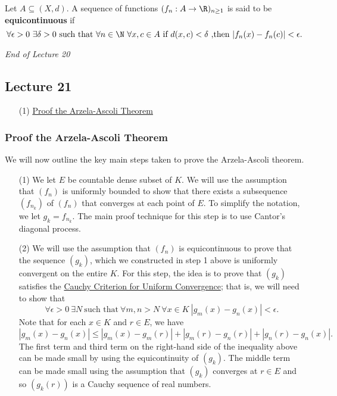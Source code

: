 \begin{definition}\label{Equicontinuous sequence of functions}
    Let \( A \subseteq (X,d) \). A sequence of functions \( ({f}_{n} : A \to \R)_{n \geq 1} \) is said to be \textbf{equicontinuous} if 
    \[  \forall \epsilon > 0 \ \exists \delta > 0 \ \text{such that} \ \forall n \in \N \ \forall x,c \in A \ \text{if} \ d(x,c) < \delta \ \text{,then} \ | {f}_{n}(x) - {f}_{n}(c) |  < \epsilon. \]
\end{definition}

\begin{center}
    \textit{End of Lecture 20} 
\end{center}
\subsection{Lecture 21}

\begin{enumerate}
    \item[(1)] {\hyperref[Proof the Arzela-Ascoli Theorem]{Proof the Arzela-Ascoli Theorem}}
\end{enumerate}


\subsubsection{Proof the Arzela-Ascoli Theorem}\label{Proof the Arzela-Ascoli Theorem}

We will now outline the key main steps taken to prove the Arzela-Ascoli theorem. 

\begin{enumerate}
\item[(1)] We let \( E  \) be countable dense subset of \( K   \). We will use the assumption that \( ({f}_{n}) \) is uniformly bounded to show that there exists a subsequence \( ({f}_{{n}_{k }}) \) of \( ({f}_{n}) \) that converges at each point of \( E  \). To simplify the notation, we let \( {g}_{k } = {f}_{{n}_{k }} \). The main proof technique for this step is to use Cantor's diagonal process. 
\item[(2)] We will use the assumption that \( ({f}_{n}) \) is equicontinuous to prove that the sequence \( ({g}_{k}) \), which we constructed in step 1 above is uniformly convergent on the entire \(  K  \). For this step, the idea is to prove that \( ({g}_{k}) \) satisfies the {\hyperref[Cauchy Criterion for Uniform Convergence]{Cauchy Criterion for Uniform Convergence}}; that is, we will need to show that 
    \[  \forall \epsilon > 0 \ \exists N \ \text{such that} \ \forall m,n > N \ \forall x \in K \ | {g}_{m}(x) - {g}_{n}(x) | < \epsilon. \]
    Note that for each \( x \in K  \) and \( r \in E  \), we have 
    \[  | {g}_{m}(x) - {g}_{n}(x) | \leq | {g}_{m}(x) - {g}_{m}(r) | + | {g}_{m}(r) - {g}_{n}(r)  |  + | {g}_{n}(r) - {g}_{n}(x) |. \]
    The first term and third term on the right-hand side of the inequality above can be made small by using the equicontinuity of \( ({g}_{k}) \). The middle term can be made small using the assumption that \( ({g}_{k}) \) converges at \( r \in E  \) and so \( ({g}_{k }(r)) \) is a Cauchy sequence of real numbers.
\end{enumerate}

